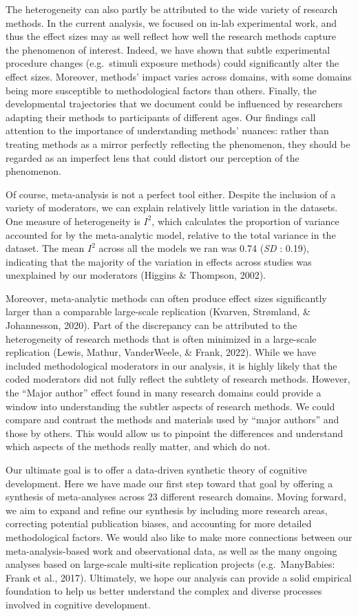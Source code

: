 \documentclass[10pt, letterpaper]{article}
\begin{document}
The heterogeneity can also partly be attributed to the wide variety of
research methods. In the current analysis, we focused on in-lab
experimental work, and thus the effect sizes may as well reflect how
well the research methods capture the phenomenon of interest. Indeed, we
have shown that subtle experimental procedure changes (e.g.~stimuli
exposure methods) could significantly alter the effect sizes. Moreover,
methods' impact varies across domains, with some domains being more
susceptible to methodological factors than others. Finally, the
developmental trajectories that we document could be influenced by
researchers adapting their methods to participants of different ages.
Our findings call attention to the importance of understanding methods'
nuances: rather than treating methods as a mirror perfectly reflecting
the phenomenon, they should be regarded as an imperfect lens that could
distort our perception of the phenomenon.

Of course, meta-analysis is not a perfect tool either. Despite the
inclusion of a variety of moderators, we can explain relatively little
variation in the datasets. One measure of heterogeneity is \(I^2\),
which calculates the proportion of variance accounted for by the
meta-analytic model, relative to the total variance in the dataset. The
mean \(I^2\) across all the models we ran was 0.74 (\emph{SD} : 0.19),
indicating that the majority of the variation in effects across studies
was unexplained by our moderators (Higgins \& Thompson, 2002).

Moreover, meta-analytic methods can often produce effect sizes
significantly larger than a comparable large-scale replication (Kvarven,
Strømland, \& Johannesson, 2020). Part of the discrepancy can be
attributed to the heterogeneity of research methods that is often
minimized in a large-scale replication (Lewis, Mathur, VanderWeele, \&
Frank, 2022). While we have included methodological moderators in our
analysis, it is highly likely that the coded moderators did not fully
reflect the subtlety of research methods. However, the ``Major author''
effect found in many research domains could provide a window into
understanding the subtler aspects of research methods. We could compare
and contrast the methods and materials used by ``major authors'' and
those by others. This would allow us to pinpoint the differences and
understand which aspects of the methods really matter, and which do not.

Our ultimate goal is to offer a data-driven synthetic theory of
cognitive development. Here we have made our first step toward that goal
by offering a synthesis of meta-analyses across 23 different research
domains. Moving forward, we aim to expand and refine our synthesis by
including more research areas, correcting potential publication biases,
and accounting for more detailed methodological factors. We would also
like to make more connections between our meta-analysis-based work and
observational data, as well as the many ongoing analyses based on
large-scale multi-site replication projects (e.g.~ManyBabies: Frank et
al., 2017). Ultimately, we hope our analysis can provide a solid
empirical foundation to help us better understand the complex and
diverse processes involved in cognitive development.
\end{document}
